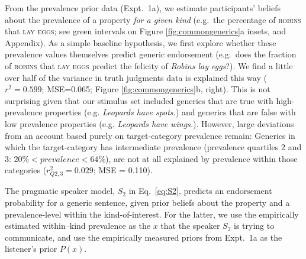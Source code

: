 \documentclass[12pt,letterpaper]{article}
\newcommand{\mht}[1]{\textcolor{Blue}{[mht: #1]}}
\begin{document}
 
 
From the prevalence prior data (Expt.~1a), we estimate participants' beliefs about the prevalence of a property \emph{for a given kind} (e.g.~the percentage of \textsc{robins} that \textsc{lay eggs}; see green intervals on Figure \ref{fig:commongenerics}a insets, and Appendix).
As a simple baseline hypothesis, we first explore whether these prevalence values themselves predict generic endorsement (e.g.~does the fraction of \textsc{robins} that \textsc{lay eggs} predict the felicity of \emph{Robins lay eggs}?).
We find a little over half of the variance in truth judgments data is explained this way ($r^2 = 0.599$; MSE=0.065; Figure \ref{fig:commongenerics}b, right). 
This is not surprising given that our stimulus set included generics that are true with high-prevalence properties (e.g. \emph{Leopards have spots.}) and  generics that are false with low prevalence properties (e.g. \emph{Leopards have wings.}). 
However, large deviations from an account based purely on target-category prevalence remain: Generics in which the target-category has intermediate prevalence (prevalence quartiles 2 and 3: $ 20\% < prevalence < 64\%$), are not at all explained by prevalence within those categories ($r_{Q2,3}^2 = 0.029$; MSE = 0.110).



The pragmatic speaker model, $S_2$ in Eq.~\ref{eq:S2}, predicts an endorsement probability for a generic sentence, given prior beliefs about the property and a prevalence-level within the kind-of-interest. 
For the latter, we use the empirically estimated within--kind prevalence as the $x$ that the speaker $S_2$ is trying to communicate, and use the empirically measured priors from Expt.~1a as the listener's prior $P(x)$. 
\end{document}
